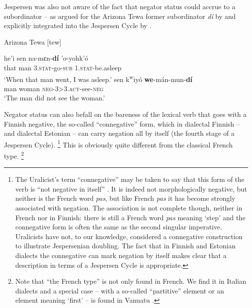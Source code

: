 ﻿\documentclass[output=paper]{langsci/langscibook}
\begin{document}
%
Jespersen was also not aware of the fact that negator status could accrue
to a subordinator -- as argued for the Arizona Tewa former subordinator
\textit{dí} by \textcite{Kroskrity1984} and explicitly integrated into the
Jespersen Cycle by \textcite[83]{Auwera2010}. 
%
\begin{exe}\ex\label{ex:int-tewa-man}
Arizona Tewa [tew] 
\begin{xlist}
\ex \gll he'i  sen  na-mεn-\textbf{dí} 'o-yohk'ó \\
    that  man  3.\textsc{stat}-go-\textsc{sub}  1.\textsc{stat}-be.asleep \\
    \glt `When that man went, I was asleep.'
\ex \gll sen  k\textsuperscript{w}iyó    \textbf{we}-mán-mun-\textbf{dí}\\
man  woman  \textsc{neg-3>3.act}-see-\textsc{neg}\\
\glt `The man did not see the woman.'
\end{xlist}
    \end{exe}
%
Negator status can also befall on the bareness of the lexical verb that
goes with a Finnish negative, the so-called ``connegative'' form, which in
dialectal Finnish \citep[238]{Miestamo2005} -- and dialectal
Estonian
\citep[425--426]{Tamm2015} -- can carry negation all by itself (the fourth
stage of a Jespersen Cycle).%
%
    \footnote{The Uralicist's term ``connegative'' may be taken to say that
    this form of the verb is ``not negative in itself''
    \parencites[82]{Miestamo2005}[56]{WagnerNagy2011}. It is indeed not
    morphologically negative, but neither is the French word \textit{pas},
    but like French \textit{pas} it has become strongly associated with
    negation. The association is not complete though, neither in French nor
    in Finnish: there is still a French word \textit{pas} meaning `step'
    and the connegative form is often the same as the second singular
    imperative.  Uralicists have not, to our knowledge, considered a
    connegative construction to illustrate Jespersenian doubling. The fact
    that in Finnish and Estonian dialects the connegative can mark negation
    by itself makes clear that a description in terms of a Jespersen Cycle
    is appropriate.} %
%
This is obviously quite different from the classical French type.%
%
    \footnote{Note that ``the French type'' is not only found in French.
    We find it in Italian dialects and a special case -- with a so-called
    ``partitive'' element or an element meaning `first' -- is found in
    Vanuatu \parencite[72--74]{VossenAuwera2014}.} %
\end{document}
